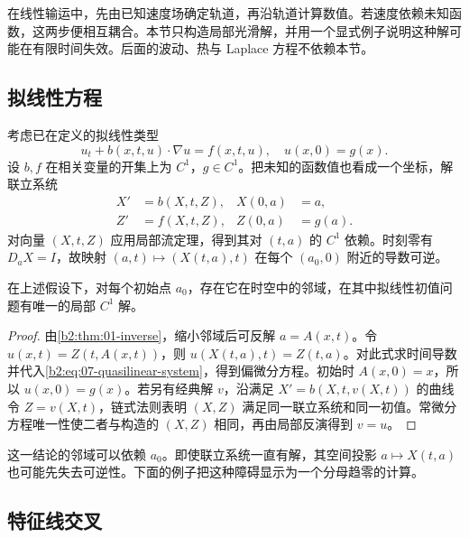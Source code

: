 
在线性输运中，先由已知速度场确定轨道，再沿轨道计算数值。若速度依赖未知函数，这两步便相互耦合。本节只构造局部光滑解，并用一个显式例子说明这种解可能在有限时间失效。后面的波动、热与 Laplace 方程不依赖本节。

\subsection{拟线性方程}
\label{b2:subsec:070401}

考虑已在定义的拟线性类型
\[
 u_t+b(x,t,u)\cdot\nabla u=f(x,t,u),\quad u(x,0)=g(x).
\]
设 \(b,f\) 在相关变量的开集上为 \(C^1\)，\(g\in C^1\)。把未知的函数值也看成一个坐标，解联立系统
\begin{equation}\label{b2:eq:07-quasilinear-system}
 \begin{aligned}
 X'&=b(X,t,Z),&X(0,a)&=a,\\
 Z'&=f(X,t,Z),&Z(0,a)&=g(a).
 \end{aligned}
\end{equation}
对向量 \((X,t,Z)\) 应用局部流定理，得到其对 \((t,a)\) 的 \(C^1\) 依赖。时刻零有 \(D_aX=I\)，故映射 \((a,t)\mapsto(X(t,a),t)\) 在每个 \((a_0,0)\) 附近的导数可逆。

\begin{proposition}\label{b2:prop:07-quasilinear-local}
在上述假设下，对每个初始点 \(a_0\)，存在它在时空中的邻域，在其中拟线性初值问题有唯一的局部 \(C^1\) 解。
\end{proposition}
\begin{proof}
由\cref{b2:thm:01-inverse}，缩小邻域后可反解 \(a=A(x,t)\)。令 \(u(x,t)=Z(t,A(x,t))\)，则
\(u(X(t,a),t)=Z(t,a)\)。对此式求时间导数并代入\eqref{b2:eq:07-quasilinear-system}，得到偏微分方程。初始时 \(A(x,0)=x\)，所以 \(u(x,0)=g(x)\)。若另有经典解 \(v\)，沿满足 \(X'=b(X,t,v(X,t))\) 的曲线令 \(Z=v(X,t)\)，链式法则表明 \((X,Z)\) 满足同一联立系统和同一初值。常微分方程唯一性使二者与构造的 \((X,Z)\) 相同，再由局部反演得到 \(v=u\)。
\end{proof}

这一结论的邻域可以依赖 \(a_0\)。即使联立系统一直有解，其空间投影 \(a\mapsto X(t,a)\) 也可能先失去可逆性。下面的例子把这种障碍显示为一个分母趋零的计算。

\subsection{特征线交叉}
\label{b2:subsec:070402}

